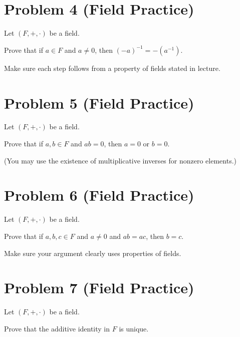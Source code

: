 \documentclass[12pt]{article}
\begin{document}
\vfill

\newpage

\section*{Problem 4 (Field Practice)}

Let $(F,+,\cdot)$ be a field.

Prove that if $a \in F$ and $a \neq 0$, then $(-a)^{-1} = -(a^{-1})$.

Make sure each step follows from a property of fields stated in lecture.

\vfill

\newpage

\section*{Problem 5 (Field Practice)}

Let $(F,+,\cdot)$ be a field.

Prove that if $a,b \in F$ and $ab = 0$, then $a = 0$ or $b = 0$.

(You may use the existence of multiplicative inverses for nonzero elements.)

\vfill

\newpage

\section*{Problem 6 (Field Practice)}

Let $(F,+,\cdot)$ be a field.

Prove that if $a,b,c \in F$ and $a \neq 0$ and $ab = ac$, then $b = c$.

Make sure your argument clearly uses properties of fields.

\vfill

\newpage

\section*{Problem 7 (Field Practice)}

Let $(F,+,\cdot)$ be a field.

Prove that the additive identity in $F$ is unique.
\end{document}
